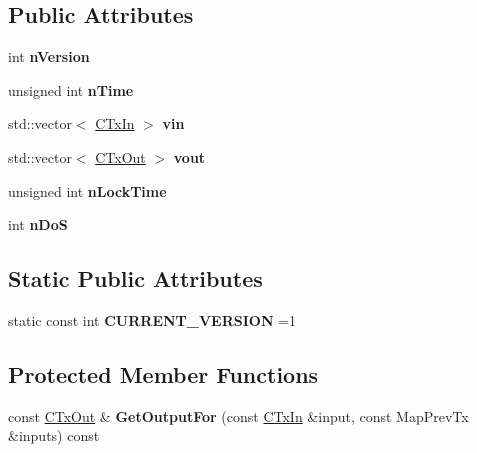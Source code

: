 \subsection*{Public Attributes}
\begin{DoxyCompactItemize}
\item 
\mbox{\label{class_c_transaction_a6c29bdd822859c7b21b7b6c22dca6825}} 
int {\bfseries n\+Version}
\item 
\mbox{\label{class_c_transaction_a8ccb4b6020669bc562095e3417715e41}} 
unsigned int {\bfseries n\+Time}
\item 
\mbox{\label{class_c_transaction_a53fa787e4ea57374b4fa2a28e9a957b2}} 
std\+::vector$<$ \mbox{\hyperlink{class_c_tx_in}{C\+Tx\+In}} $>$ {\bfseries vin}
\item 
\mbox{\label{class_c_transaction_ae42c0032a464c3054c508017c7d040ef}} 
std\+::vector$<$ \mbox{\hyperlink{class_c_tx_out}{C\+Tx\+Out}} $>$ {\bfseries vout}
\item 
\mbox{\label{class_c_transaction_ab01e4e451d2f3f84b01380979c8fdacc}} 
unsigned int {\bfseries n\+Lock\+Time}
\item 
\mbox{\label{class_c_transaction_a2a1fd6929add85d3df299249da78d015}} 
int {\bfseries n\+DoS}
\end{DoxyCompactItemize}
\subsection*{Static Public Attributes}
\begin{DoxyCompactItemize}
\item 
\mbox{\label{class_c_transaction_aa728c112d5cdd174ee156a67107f1cf4}} 
static const int {\bfseries C\+U\+R\+R\+E\+N\+T\+\_\+\+V\+E\+R\+S\+I\+ON} =1
\end{DoxyCompactItemize}
\subsection*{Protected Member Functions}
\begin{DoxyCompactItemize}
\item 
\mbox{\label{class_c_transaction_a6b7535cbc89183563196d24c3b1d53cd}} 
const \mbox{\hyperlink{class_c_tx_out}{C\+Tx\+Out}} \& {\bfseries Get\+Output\+For} (const \mbox{\hyperlink{class_c_tx_in}{C\+Tx\+In}} \&input, const Map\+Prev\+Tx \&inputs) const
\end{DoxyCompactItemize}
